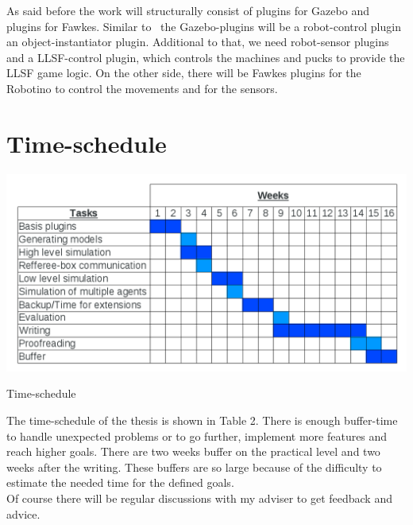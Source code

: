 \documentclass[11pt,a4paper,titlepage]{article}
\begin{document}
As said before the work will structurally consist of plugins for Gazebo and plugins for Fawkes. Similar to~\cite{KlingenDA} the Gazebo-plugins will be a robot-control plugin an object-instantiator plugin. Additional to that, we need robot-sensor plugins and a LLSF-control plugin, which controls the machines and pucks to provide the LLSF game logic. On the other side, there will be Fawkes plugins for the Robotino to control the movements and for the sensors.

\section{Time-schedule}

\begin{table}
\includegraphics[scale=0.33]{pics/Schedule.png}
\label{Table 2}
\caption{Time-schedule}
\end{table}

The time-schedule of the thesis is shown in Table 2. There is enough buffer-time to handle unexpected problems or to go further, implement more features and reach higher goals. There are two weeks buffer on the practical level and two weeks after the writing. These buffers are so large because of the difficulty to estimate the needed time for the defined goals.\\
Of course there will be regular discussions with my adviser to get feedback and advice.
\end{document}
